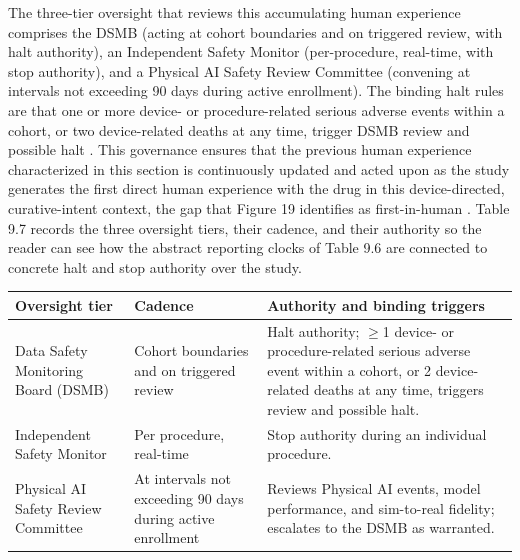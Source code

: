 The three-tier oversight that reviews this accumulating human experience comprises
the DSMB (acting at cohort boundaries and on triggered review, with halt
authority), an Independent Safety Monitor (per-procedure, real-time, with stop
authority), and a Physical AI Safety Review Committee (convening at intervals not
exceeding 90 days during active enrollment). The binding halt rules are that one or
more device- or procedure-related serious adverse events within a cohort, or two
device-related deaths at any time, trigger DSMB review and possible halt
\cite{onpremwhippl, congress9510}. This governance ensures that the previous human
experience characterized in this section is continuously updated and acted upon as
the study generates the first direct human experience with the drug in this
device-directed, curative-intent context, the gap that Figure 19 identifies as
first-in-human \cite{clintrustpai}. Table 9.7 records the three oversight tiers,
their cadence, and their authority so the reader can see how the abstract reporting
clocks of Table 9.6 are connected to concrete halt and stop authority over the
study.

\noindent\begin{tabularx}{\textwidth}{L{4.4cm} L{4.0cm} Y}
\toprule
\textbf{Oversight tier} & \textbf{Cadence} & \textbf{Authority and binding triggers} \\
\midrule
Data Safety Monitoring Board (DSMB) & Cohort boundaries and on triggered review & Halt authority; $\geq$1 device- or procedure-related serious adverse event within a cohort, or 2 device-related deaths at any time, triggers review and possible halt. \\
Independent Safety Monitor & Per procedure, real-time & Stop authority during an individual procedure. \\
Physical AI Safety Review Committee & At intervals not exceeding 90 days during active enrollment & Reviews Physical AI events, model performance, and sim-to-real fidelity; escalates to the DSMB as warranted. \\
\bottomrule
\end{tabularx}
\vspace{-0.2cm}

